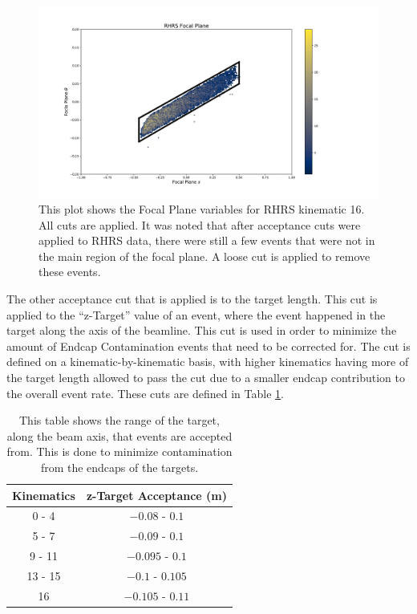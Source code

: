 \begin{figure}
\begin{center}
	\includegraphics[width=\textwidth]{./analysis/fig/RHRS_fp.pdf}
	\caption{This plot shows the Focal Plane variables for RHRS kinematic 16. All cuts are applied. It was noted that after acceptance cuts were applied to RHRS data, there were still a few events that were not in the main region of the focal plane. A loose cut is applied to remove these events.}
	\label{fig:rfp}
\end{center}
\end{figure}

The other acceptance cut that is applied is to the target length. This cut is applied to the ``z-Target'' value of an event, where the event happened in the target along the axis of the beamline. This cut is used in order to minimize the amount of Endcap Contamination events that need to be corrected for. The cut is defined on a kinematic-by-kinematic basis, with higher kinematics having more of the target length allowed to pass the cut due to a smaller endcap contribution to the overall event rate. These cuts are defined in Table \ref{tbl:ztar}.

\begin{table}
\begin{center}
\begin{tabular}{|c|c|}
\hline
\textbf{Kinematics} & \textbf{z-Target Acceptance (m)}\\
\hline\hline
0 - 4 & $-0.08$ - $0.1$ \\ \hline
5 - 7 & $-0.09$ - $0.1$ \\ \hline
9 - 11 & $-0.095$ - $0.1$ \\ \hline
13 - 15 & $-0.1$ - $0.105$ \\ \hline
16 & $-0.105$ - $0.11$ \\ \hline
\end{tabular}
\caption{This table shows the range of the target, along the beam axis, that events are accepted from. This is done to minimize contamination from the endcaps of the targets.}
\label{tbl:ztar}
\end{center}
\end{table}